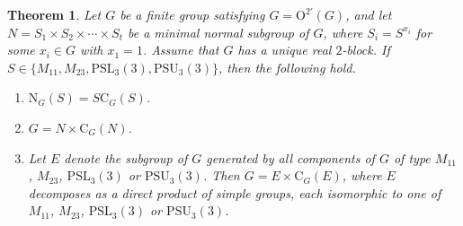 \documentclass[10pt]{article}
\newtheorem{thm}[lem]{\bf Theorem}
\begin{document}
\begin{thm}\label{thm: M11 M23}
  Let $G$ be a finite group satisfying $G=\mathrm{O}^{2'}(G)$, and let 
  $N = S_1 \times S_2 \times \cdots \times S_t$ be a minimal normal subgroup of $G$, 
  where $S_i = S^{x_i}$ for some $x_i \in G$ with $x_1 = 1$. 
  Assume that $G$ has a unique real $2$-block.
  If $S\in \{ M_{11},M_{23}, \mathrm{PSL}_{3}(3),\mathrm{PSU}_{3}(3) \}$,
  then the following hold.
  \begin{enumerate}[\rm (1)]
    \item $\mathrm{N}_{G}(S)=S\mathrm{C}_{G}(S)$. 
    \item $G=N\times \mathrm{C}_{G}(N)$.
    \item Let $E$ denote the subgroup of $G$ generated by all components of $G$ of type $M_{11}$, $M_{23}$, $\mathrm{PSL}_{3}(3)$ or $\mathrm{PSU}_{3}(3)$.
    Then $G=E\times \mathrm{C}_{G}(E)$, where $E$ decomposes as a direct product of simple groups, each isomorphic to one of $M_{11}$, $M_{23}$, $\mathrm{PSL}_3(3)$ or $\mathrm{PSU}_3(3)$.
  \end{enumerate}
\end{thm}
\end{document}
